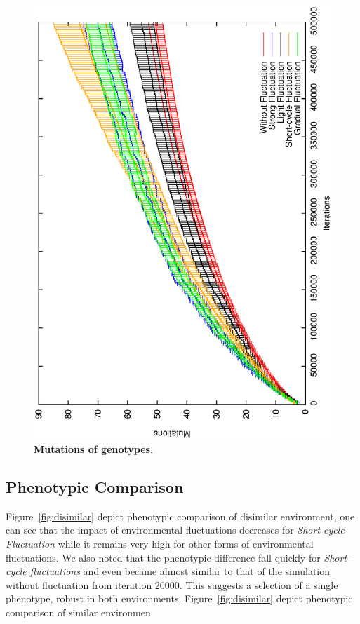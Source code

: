 \begin{figure}[h]
\centering
\includegraphics[width=0.7\columnwidth, angle =-90 ]{img/Mutations}
\caption{\textbf{Mutations of genotypes}.
}
\label{fig:Mutations}
\end{figure}

\subsection{Phenotypic Comparison}
Figure~\ref{fig:disimilar} depict phenotypic comparison of disimilar environment, one can see that the impact of environmental fluctuations decreases for \emph{Short-cycle  Fluctuation} while it remains very high for other forms of environmental fluctuations. We also noted that the phenotypic difference fall quickly for \emph{Short-cycle fluctuations} and even became almost similar to that of the simulation without fluctuation from iteration 20000. This suggests a selection of a single phenotype, robust in both environments. Figure~\ref{fig:disimilar} depict phenotypic comparison of similar environmen

